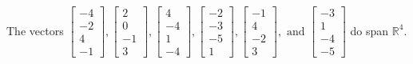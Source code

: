 \begin{exercise}
\begin{exerciseStatement}
  \end{exerciseStatement}
  \begin{exerciseAnswer}
   The vectors \(\left[\begin{array}{r}
-4 \\
-2 \\
4 \\
-1
\end{array}\right] , \left[\begin{array}{r}
2 \\
0 \\
-1 \\
3
\end{array}\right] , \left[\begin{array}{r}
4 \\
-4 \\
1 \\
-4
\end{array}\right] , \left[\begin{array}{r}
-2 \\
-3 \\
-5 \\
1
\end{array}\right] , \left[\begin{array}{r}
-1 \\
4 \\
-2 \\
3
\end{array}\right] , \text{ and } \left[\begin{array}{r}
-3 \\
1 \\
-4 \\
-5
\end{array}\right]\) 
  	 do  
	span \(\mathbb{R}^4\).
  


  \end{exerciseAnswer}
\end{exercise}